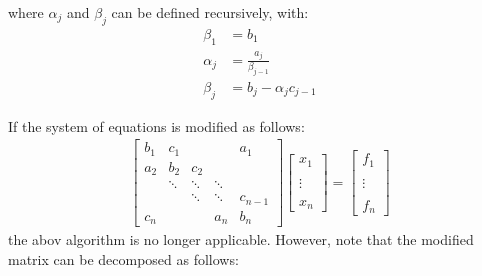 \documentclass{article}
\begin{document}
where $\alpha_j$ and $\beta_j$ can be defined recursively, with:
\begin{align*}
    \beta_1 & = b_1 \\
    \alpha_j & = \frac{a_j}{\beta_{j-1}} \\
    \beta_j & = b_j - \alpha_j c_{j-1}
\end{align*}

If the system of equations is modified as follows:
\begin{align*}
    \begin{bmatrix}
        b_1 & c_1 & & & a_1 \\
        a_2 & b_2 & c_2 & & \\
        & \ddots & \ddots & \ddots & \\
        & & \ddots & \ddots & c_{n-1} \\
        c_n & & & a_n & b_n
    \end{bmatrix}
    \begin{bmatrix}
        x_1 \\ \\ \vdots \\ \\ x_n
    \end{bmatrix}
    =
    \begin{bmatrix}
        f_1 \\ \\ \vdots \\ \\ f_n
    \end{bmatrix}
\end{align*}
the abov algorithm is no longer applicable. However, note that the modified matrix can be decomposed as follows:
\end{document}
